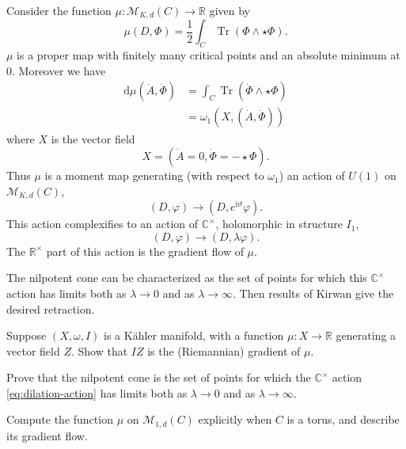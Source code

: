 \documentclass[12pt,letterpaper,reqno]{article}
\numberwithin{equation}{section}
\newcommand{\cM}{\ensuremath{\mathcal M}}
\newcommand{\R}{\ensuremath{\mathbb R}}
\newcommand{\C}{\ensuremath{\mathbb C}}
\newcommand{\half}{\ensuremath{\frac{1}{2}}}
\newcommand{\kahler}{K\"ahler\xspace}
\newcommand{\I}{{\mathrm i}}
\newcommand{\de}{\mathrm{d}}
\DeclareMathOperator{\Tr}{Tr}
\newcommand{\fixme}[1]{{\color{orange}{[#1]}}}
\begin{document}
\begin{pf} \fixme{Hausel thesis} Consider the function $\mu: \cM_{K,d}(C) \to \R$ given by
\begin{equation} \label{eq:morse-function}
  \mu(D,\Phi) = \half \int_C \Tr (\Phi \wedge \star \Phi).
\end{equation}
$\mu$ is a proper
map \fixme{why?} with finitely many critical points
and an absolute minimum at $0$.
Moreover we have
\begin{align}
  \de \mu(\dot A, \dot \Phi) &= \int_C \Tr (\dot\Phi \wedge \star \Phi) \\
  &= \omega_1(X,(\dot A, \dot \Phi))
\end{align}
where $X$ is the vector field
\begin{equation}
  X = (\dot A = 0, \dot \Phi = -\star \Phi).
\end{equation}
Thus $\mu$ is a moment map generating (with respect to $\omega_1$)
an action of $U(1)$ on $\cM_{K,d}(C)$,
\begin{equation}
  (D,\varphi) \to (D,e^{\I \vartheta} \varphi).
\end{equation}
This action complexifies to an action of $\C^\times$, holomorphic
in structure $I_1$,
\begin{equation} \label{eq:dilation-action}
  (D,\varphi) \to (D,\lambda \varphi).
\end{equation}
The $\R^\times$ part of this action is the gradient flow of $\mu$.

The nilpotent cone can be characterized as the set of points
for which this $\C^\times$ action has limits both as $\lambda \to 0$
and as $\lambda \to \infty$.
Then results of Kirwan \fixme{...} give the desired retraction.

\end{pf}

\begin{exercise} Suppose $(X,\omega,I)$
is a \kahler manifold, with a function $\mu: X \to \R$
generating a vector field $Z$. Show that $IZ$ is the (Riemannian) gradient
of $\mu$.
\end{exercise}

\begin{exercise} Prove that the nilpotent cone is the set of points
for which the $\C^\times$ action \eqref{eq:dilation-action} has
limits both as $\lambda \to 0$
and as $\lambda \to \infty$.
\end{exercise}

\begin{exercise} Compute the function $\mu$ on $\cM_{1,d}(C)$
explicitly when $C$ is a torus, and describe its gradient flow.
\end{exercise}
\end{document}
